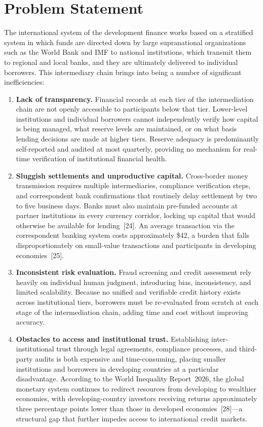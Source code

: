 \documentclass[12pt,a4paper]{report}
\begin{document}
\section{Problem Statement}

The international system of the development finance works based on a stratified system in which funds are directed down by large supranational organizations such as the World Bank and IMF to national institutions, which transmit them to regional and local banks, and they are ultimately delivered to individual borrowers. This intermediary chain brings into being a number of significant inefficiencies:

\begin{enumerate}[noitemsep]
\item \textbf{Lack of transparency.} Financial records at each tier of the intermediation chain are not openly accessible to participants below that tier. Lower-level institutions and individual borrowers cannot independently verify how capital is being managed, what reserve levels are maintained, or on what basis lending decisions are made at higher tiers. Reserve adequacy is predominantly self-reported and audited at most quarterly, providing no mechanism for real-time verification of institutional financial health.

\item \textbf{Sluggish settlements and unproductive capital.} Cross-border money transmission requires multiple intermediaries, compliance verification steps, and correspondent bank confirmations that routinely delay settlement by two to five business days. Banks must also maintain pre-funded accounts at partner institutions in every currency corridor, locking up capital that would otherwise be available for lending~[24]. An average transaction via the correspondent banking system costs approximately \$42, a burden that falls disproportionately on small-value transactions and participants in developing economies~[25].

\item \textbf{Inconsistent risk evaluation.} Fraud screening and credit assessment rely heavily on individual human judgment, introducing bias, inconsistency, and limited scalability. Because no unified and verifiable credit history exists across institutional tiers, borrowers must be re-evaluated from scratch at each stage of the intermediation chain, adding time and cost without improving accuracy.

\item \textbf{Obstacles to access and institutional trust.} Establishing inter-institutional trust through legal agreements, compliance processes, and third-party audits is both expensive and time-consuming, placing smaller institutions and borrowers in developing countries at a particular disadvantage. According to the World Inequality Report~2026, the global monetary system continues to redirect resources from developing to wealthier economies, with developing-country investors receiving returns approximately three percentage points lower than those in developed economies~[28]---a structural gap that further impedes access to international credit markets.


\end{enumerate}
\end{document}
